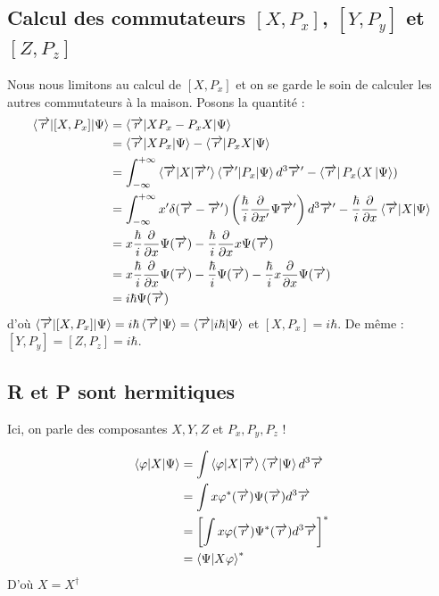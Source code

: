\documentclass[12pt,a4paper,titlepage]{book}
\begin{document}
\subsection{Calcul des commutateurs $[X, P_x]$, $[Y, P_y]$ et $[Z, P_z]$}

Nous nous limitons au calcul de $[X, P_x]$ et on se garde le soin de calculer les autres commutateurs à la maison. Posons la quantité :
\begin{align*}
\braket{\overrightarrow{r} \vert [X, P_x] \vert \Psi} &= \braket{\overrightarrow{r} \vert X P_x - P_x X \vert \Psi}\\
&= \braket{\overrightarrow{r} \vert X P_x \vert \Psi} - \braket{\overrightarrow{r} \vert P_x X \vert \Psi}\\
&= \int_{- \infty}^{+ \infty} \braket{\overrightarrow{r} \vert X \vert \overrightarrow{r}'} \braket{\overrightarrow{r}' \vert P_x \vert \Psi} d^3 \overrightarrow{r}' - \bra{\overrightarrow{r}} P_x (X \ket{\Psi})\\
&= \int_{- \infty}^{+ \infty} x' \delta (\overrightarrow{r} - \overrightarrow{r}') \left( \frac{\hbar}{i} \frac{\partial}{\partial x'} \Psi \overrightarrow{r}' \right) d^3 \overrightarrow{r}' - \frac{\hbar}{i} \frac{\partial}{\partial x} \braket{\overrightarrow{r} \vert X \vert \Psi}\\
&= x \frac{\hbar}{i} \frac{\partial}{\partial x} \Psi (\overrightarrow{r}) - \frac{\hbar}{i} \frac{\partial}{\partial x} x \Psi (\overrightarrow{r})\\
&= x \frac{\hbar}{i} \frac{\partial}{\partial x} \Psi (\overrightarrow{r}) - \frac{\hbar}{i} \Psi (\overrightarrow{r}) - \frac{\hbar}{i} x \frac{\partial}{\partial x} \Psi (\overrightarrow{r})\\
&= i \hbar \Psi (\overrightarrow{r})
\end{align*}
d'où $\braket{\overrightarrow{r} \vert [X, P_x] \vert \Psi} = i \hbar \braket{\overrightarrow{r} \vert \Psi} = \braket{\overrightarrow{r} \vert i \hbar \vert \Psi}$ et $[X, P_x] = i \hbar$. De même : $[Y, P_y] = [Z, P_z] = i \hbar$.

\subsection{R et P sont hermitiques}

Ici, on parle des composantes $X,Y,Z$ et $P_x, P_y, P_z$ ! 

\begin{align*}
\braket{\varphi \vert X \vert \Psi} &= \int \braket{\varphi \vert X \vert \overrightarrow{r}} \braket{\overrightarrow{r} \vert \Psi} d^3 \overrightarrow{r}\\
&= \int x \varphi^* (\overrightarrow{r}) \Psi (\overrightarrow{r}) d^3 \overrightarrow{r}\\
&= \left[ \int x \varphi (\overrightarrow{r}) \Psi^* (\overrightarrow{r}) d^3 \overrightarrow{r} \right]^*\\
&= \braket{\Psi \vert X \varphi}^*
\end{align*}
D'où $X = X^\dagger$
\end{document}
